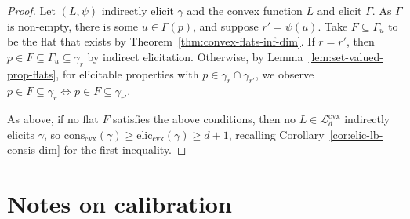 \documentclass[11pt]{article} %
\newcommand{\Comments}{1}
\newcommand{\mynote}[2]{\ifnum\Comments=1\textcolor{#1}{#2}\fi}
\newcommand{\mytodo}[2]{\ifnum\Comments=1%
	\todo[linecolor=#1!80!black,backgroundcolor=#1,bordercolor=#1!80!black]{#2}\fi}
\newcommand{\jessie}[1]{\mynote{teal}{[JF: #1]}}
\newcommand{\jessiet}[1]{\mytodo{teal!20!white}{JF: #1}}
\newcommand{\relint}[1]{\mathrm{relint}(#1)}
\newcommand{\prop}[2][\mathcal{P}]{\mathrm{prop}_{#1}[#2]}
\newcommand{\eliccvx}{\mathrm{elic}_\mathrm{cvx}}
\newcommand{\conscvx}{\mathrm{cons}_\mathrm{cvx}}
\newcommand{\range}{\mathrm{range}\,}
\newcommand{\Pcodimension}{$\mathcal{P}$-codimension\,}
\newcommand{\Lcvx}{\mathcal{L}^{\mathrm{cvx}}}
\renewcommand{\P}{\mathcal{P}}
\newcommand{\Y}{\mathcal{Y}}
\newtheorem{lemma}{Lemma}
\begin{document}


\Pcodimflatelicrelintprop*
\begin{proof}
	Let $(L, \psi)$ indirectly elicit $\gamma$ and the convex function $L$ and elicit $\Gamma$.
	As $\Gamma$ is non-empty, there is some $u \in \Gamma(p)$, and suppose $r' = \psi(u)$.
	Take $F \subseteq \Gamma_u$ to be the flat that exists by Theorem~\ref{thm:convex-flats-inf-dim}.
	If $r = r'$, then $p \in F \subseteq \Gamma_u \subseteq \gamma_r$ by indirect elicitation.
	Otherwise, by Lemma~\ref{lem:set-valued-prop-flats}, for elicitable properties with $p \in \gamma_r \cap \gamma_{r'}$, we observe $p \in F\subseteq \gamma_r \iff p \in F \subseteq \gamma_{r'}$.
	
	As above, if no flat $F$ satisfies the above conditions, then no $L\in\Lcvx_d$ indirectly elicits $\gamma$, so $\conscvx(\gamma) \geq \eliccvx(\gamma) \geq d+1$, recalling Corollary~\ref{cor:elic-lb-consis-dim} for the first inequality.
\end{proof}




\section{Notes on calibration}\label{app:calibration}
\end{document}
